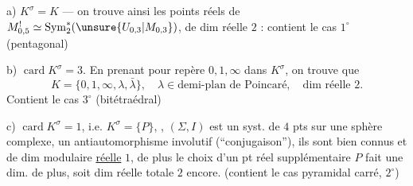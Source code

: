 a) \(K^\sigma=K\) --- on trouve ainsi les points réels de \(M_{0,5}^{!}\simeq\mathrm{Sym}_2^*(\unsure{U_{0,3}|M_{0,3}})\),
 de dim réelle \(2\) : contient le cas \(1^\circ\) (pentagonal)

b) \(\operatorname{card}K^\sigma=3\). En prenant pour repère \(0,1,\infty\) dans \(K^\sigma\), on trouve que
\[
K=\{0,1,\infty,\lambda,\bar\lambda\},\quad
\lambda\in\text{demi-plan de Poincaré},\quad\text{dim réelle }2.
\]
Contient le cas \(3^\circ\) (bitétraédral)

c) \(\operatorname{card}K^\sigma=1\), i.e.  \(K^\sigma=\{P\}\), , 
\((\Sigma,I)\) est un syst. de \(4\) pts sur une sphère complexe,   un antiautomorphisme \deleted{\(\unsure{\sigma}\)} involutif (``conjugaison''), ils sont bien connus et de dim modulaire \uline{réelle} \(1\), de plus le choix d’un pt réel supplémentaire \(P\) fait une dim. de plus, soit dim réelle totale \(2\) encore.
(contient le cas pyramidal carré, \(2^\circ\))


